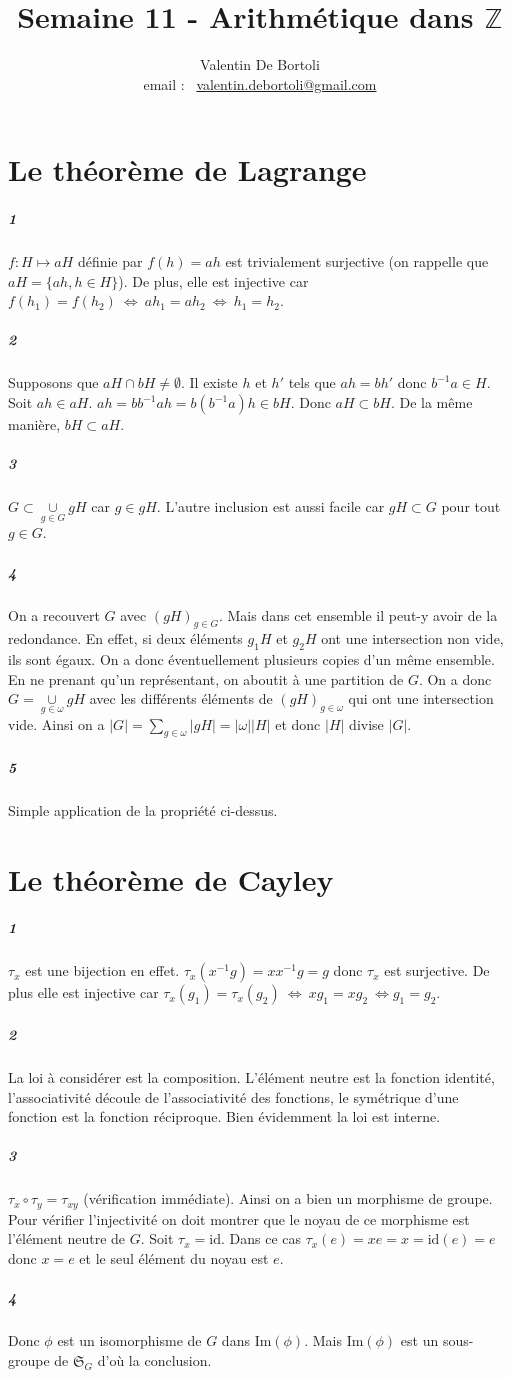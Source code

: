 \documentclass[10pt,a4paper]{article}
\title{Semaine 11 - Arithmétique dans $\mathbb{Z}$}
\author{Valentin De Bortoli \\ email : \ \href{mailto:valentin.debortoli@gmail.com}{valentin.debortoli@gmail.com}}
\date{}
\begin{document}
\maketitle
\section{Le théorème de Lagrange}
\subparagraph{1} $f : H \mapsto aH$ définie par $f(h)=ah$ est trivialement surjective (on rappelle que $aH=\lbrace ah, h \in H \rbrace$). De plus, elle est injective car $f(h_1)=f(h_2) \ \Leftrightarrow \ ah_1=ah_2 \ \Leftrightarrow \ h_1=h_2$.
\subparagraph{2} Supposons que $aH \cap bH \neq \emptyset$. Il existe $h$ et $h'$ tels que $ah=bh'$ donc $b^{-1}a \in H$. Soit $ah \in aH$. $ah=bb^{-1}ah=b(b^{-1}a)h \in bH$. Donc $aH \subset bH$. De la même manière, $bH \subset aH$.
\subparagraph{3} $G \subset \underset{g \in G}{\cup}gH$ car $g \in gH$. L'autre inclusion est aussi facile car $gH \subset G$ pour tout $g \in G$.
\subparagraph{4} On a recouvert $G$ avec $(gH)_{g \in G}$. Mais dans cet ensemble il peut-y avoir de la redondance. En effet, si deux éléments $g_1H$ et $g_2H$ ont une intersection non vide, ils sont égaux. On a donc éventuellement plusieurs copies d'un même ensemble. En ne prenant qu'un représentant, on aboutit à une partition de $G$. On a donc $G=\underset{g \in \omega}{\cup}gH$ avec les différents éléments de $(gH)_{g \in \omega}$ qui ont une intersection vide. Ainsi on a $\vert G \vert = \underset{g \in \omega}{\sum} \vert gH \vert= \vert \omega \vert \vert H \vert$ et donc $\vert H \vert$ divise $\vert G \vert$.
\subparagraph{5}Simple application de la propriété ci-dessus.
\section{Le théorème de Cayley}
\subparagraph{1} $\tau_x$ est une bijection en effet. $\tau_x(x^{-1}g)=x x^{-1}g=g$ donc $\tau_x$ est surjective. De plus elle est injective car $\tau_x(g_1)=\tau_x(g_2) \ \Leftrightarrow \ xg_1=xg_2 \ \Leftrightarrow g_1=g_2$.
\subparagraph{2}La loi à considérer est la composition. L'élément neutre est la fonction identité, l'associativité découle de l'associativité des fonctions, le symétrique d'une fonction est la fonction réciproque. Bien évidemment la loi est interne.
\subparagraph{3} $\tau_x \circ \tau_y =  \tau_{xy}$ (vérification immédiate). Ainsi on a bien un morphisme de groupe. Pour vérifier l'injectivité on doit montrer que le noyau de ce morphisme est l'élément neutre de $G$. Soit $\tau_x=\text{id}$. Dans ce cas $\tau_x(e)=xe=x=\text{id}(e)=e$ donc $x=e$ et le seul élément du noyau est $e$.
\subparagraph{4}Donc $\phi$ est un isomorphisme de $G$ dans $\text{Im}(\phi)$. Mais $\text{Im}(\phi)$ est un sous-groupe de $\mathfrak{S}_G$ d'où la conclusion.
\end{document}
